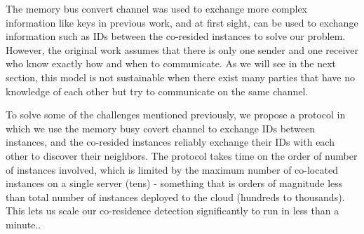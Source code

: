 The memory bus convert channel was used to exchange more complex
information like keys in previous work\cite{wuusenix2012}, and at first sight,
can be used to exchange information such as IDs between the co-resided instances
to solve our problem.  However, the original work assumes that there is only one
sender and one receiver who know exactly how and when to communicate. As we will
see in the next section, this model is not sustainable when there exist many
parties that have no knowledge of each other but try to communicate on the same
channel.

To solve some of the challenges mentioned previously, we propose a protocol in
which we use the memory busy covert channel to exchange IDs between instances,
and the co-resided instances reliably exchange their IDs with each other to
discover their neighbors. The protocol
takes time on the order of number of instances involved, which is limited by the
maximum number of co-located instances on a single server (tens) - something
that is orders of magnitude less than total number of instances deployed to the
cloud (hundreds to thousands).  This lets us scale our co-residence detection
significantly to run in less than a minute..

